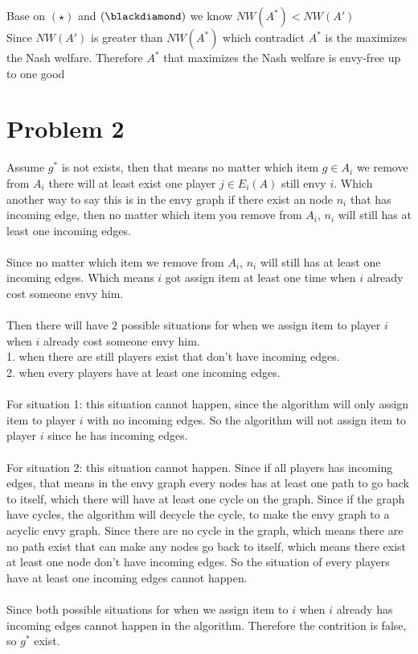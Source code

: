\documentclass{article}
\begin{document}
Base on $(\star)$ and $(\blackdiamond)$ we know $NW(A^*) < NW(A')$\\
Since $NW(A')$ is greater than $NW(A^*)$ which contradict $A^*$ is the maximizes the Nash welfare. Therefore $A^*$ that maximizes the Nash welfare is envy-free up to one good 

\newpage
\section{Problem 2}

Assume $g^*$ is not exists, then that means no matter which item $g \in A_i$ we remove from $A_i$ there will at least exist one player $j \in E_i(A)$ still envy $i$. Which another way to say this is in the envy graph if there exist an node $n_i$ that has incoming edge, then no matter which item you remove from $A_i$, $n_i$ will still has at least one incoming edges.\\\\
Since no matter which item we remove from $A_i$, $n_i$ will still has at least one incoming edges. Which means $i$ got assign item at least one time when $i$ already cost someone envy him.\\\\
Then there will have $2$ possible situations for when we assign item to player $i$ when $i$ already cost someone envy him.\\
1. when there are still players exist that don't have incoming edges.\\
2. when every players have at least one incoming edges.\\\\
For situation 1: this situation cannot happen, since the algorithm will only assign item to player $i$ with no incoming edges. So the algorithm will not assign item to player $i$ since he has incoming edges.\\\\
For situation 2: this situation cannot happen. Since if all players has incoming edges, that means in the envy graph every nodes has at least one path to go back to itself, which there will have at least one cycle on the graph. Since if the graph have cycles, the algorithm will decycle the cycle, to make the envy graph to a acyclic envy graph. Since there are no cycle in the graph, which means there are no path exist that can make any nodes go back to itself, which means there exist at least one node don't have incoming edges. So the situation of every players have at least one incoming edges cannot happen.\\\\
Since both possible situations for when we assign item to $i$ when $i$ already has incoming edges cannot happen in the algorithm. Therefore the contrition is false, so $g^*$ exist.
\end{document}

